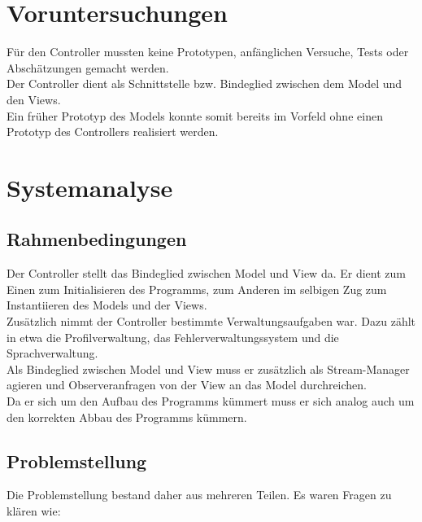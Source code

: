 \section{Voruntersuchungen}

Für den Controller mussten keine Prototypen, anfänglichen Versuche, Tests oder Abschätzungen gemacht werden.\\
Der Controller dient als Schnittstelle bzw. Bindeglied zwischen dem Model und den Views. \\
Ein früher Prototyp des Models konnte somit bereits im Vorfeld ohne einen Prototyp des Controllers realisiert werden.

\section{Systemanalyse}

\subsection{Rahmenbedingungen}
Der Controller stellt das Bindeglied zwischen Model und View da. Er dient zum Einen zum Initialisieren des Programms, zum Anderen im selbigen Zug
zum Instantiieren des Models und der Views.\\
Zusätzlich nimmt der Controller bestimmte Verwaltungsaufgaben war. Dazu zählt in etwa die Profilverwaltung, das Fehlerverwaltungssystem und die Sprachverwaltung.\\
Als Bindeglied zwischen Model und View muss er zusätzlich als Stream-Manager agieren und Observeranfragen von der View an das Model durchreichen.\\
Da er sich um den Aufbau des Programms kümmert muss er sich analog auch um den korrekten Abbau des Programms kümmern.

\subsection{Problemstellung}
Die Problemstellung bestand daher aus mehreren Teilen. Es waren Fragen zu klären wie:

